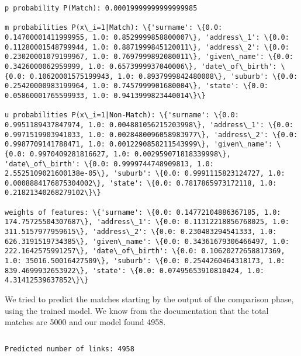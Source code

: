 \documentclass{article}
\begin{document}
    \begin{Verbatim}[commandchars=\\\{\}]
p probability P(Match): 0.00019999999999999985

m probabilities P(x\_i=1|Match): \{'surname': \{0.0: 0.14700001411999955, 1.0: 0.8529999858800007\}, 'address\_1': \{0.0: 0.11280001548799944, 1.0: 0.8871999845120011\}, 'address\_2': \{0.0: 0.23020001079199967, 1.0: 0.7697999892080011\}, 'given\_name': \{0.0: 0.3426000062959999, 1.0: 0.6573999937040006\}, 'date\_of\_birth': \{0.0: 0.10620001575199943, 1.0: 0.8937999842480008\}, 'suburb': \{0.0: 0.25420000983199964, 1.0: 0.7457999901680004\}, 'state': \{0.0: 0.05860001765599933, 1.0: 0.9413999823440014\}\}

u probabilities P(x\_i=1|Non-Match): \{'surname': \{0.0: 0.9951189437847974, 1.0: 0.004881056215203998\}, 'address\_1': \{0.0: 0.9971519903941033, 1.0: 0.0028480096058983977\}, 'address\_2': \{0.0: 0.9987709141788471, 1.0: 0.0012290858211543999\}, 'given\_name': \{0.0: 0.9970409281816627, 1.0: 0.002959071818339998\}, 'date\_of\_birth': \{0.0: 0.9999744748909813, 1.0: 2.5525109021600138e-05\}, 'suburb': \{0.0: 0.9991115823124727, 1.0: 0.0008884176875304002\}, 'state': \{0.0: 0.7817865973172118, 1.0: 0.21821340268279102\}\}

weights of features: \{'surname': \{0.0: 0.14772104886367185, 1.0: 174.75725504307687\}, 'address\_1': \{0.0: 0.11312218856768025, 1.0: 311.5157977959615\}, 'address\_2': \{0.0: 0.230483294541333, 1.0: 626.3191519734385\}, 'given\_name': \{0.0: 0.34361679306466497, 1.0: 222.1642575991257\}, 'date\_of\_birth': \{0.0: 0.10620272658817369, 1.0: 35016.50016427509\}, 'suburb': \{0.0: 0.2544260464318173, 1.0: 839.4699932653922\}, 'state': \{0.0: 0.07495653910810424, 1.0: 4.31412539637852\}\}

    \end{Verbatim}

    We tried to predict the matches starting by the output of the comparison
phase, using the trained model. We know from the documentation that the
total matches are 5000 and our model found 4958.

    \begin{Verbatim}[commandchars=\\\{\}]

\end{Verbatim}

    \begin{Verbatim}[commandchars=\\\{\}]
Predicted number of links: 4958

    \end{Verbatim}
\end{document}
